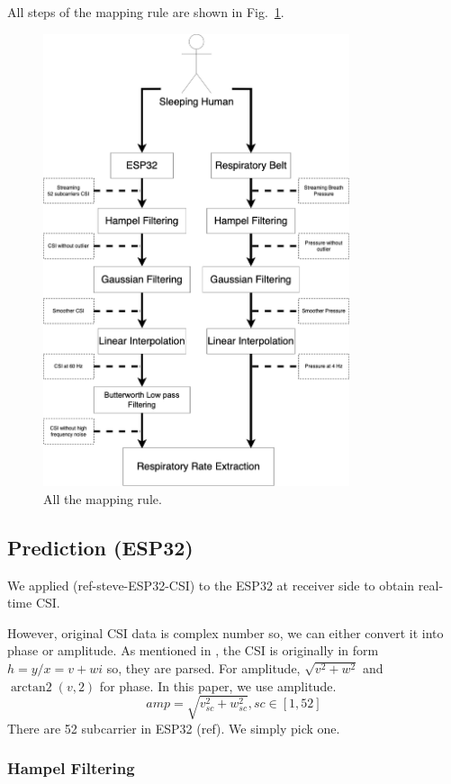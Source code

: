 \documentclass[10pt,letterpaper]{article}
\DeclareMathOperator{\arctantwo}{arctan2}
\begin{document}
	All steps of the mapping rule are shown in Fig.~\ref{fig:MAPINGSTEP}. 
	

	\begin{figure}[htbp]
		\centerline{\includegraphics[width=90mm,scale=0.2]{STEP11.png}}
		\caption{All the mapping rule.}
		\label{fig:MAPINGSTEP}
	\end{figure}
	
	\subsection*{Prediction (ESP32)}
	
	We applied (ref-steve-ESP32-CSI) to the ESP32 at receiver side to obtain real-time CSI. 
	
	However, original CSI data is complex number so, we can either convert it into phase or amplitude. As mentioned in , the CSI is originally in form $h=y/x=v+wi$ so, they are parsed. For amplitude,  $\sqrt{ v^2+w^2 }$ and $\arctantwo(v, 2 )$ for phase.
	In this paper, we use amplitude.
	\begin{equation}
	amp =  {  \sqrt{ v_{sc}^2+w_{sc}^2 } , sc \in [1, 52]}
	\label{eq:CSIampParser}
\end{equation}	
	There are 52 subcarrier in ESP32 (ref). We simply pick one.
	
	\subsubsection*{Hampel Filtering}
	
\end{document}
